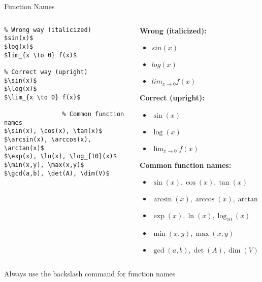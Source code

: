 \begin{frame}[fragile]{Function Names}
    \begin{columns}
        \begin{column}{0.5\textwidth}
            \begin{lstlisting}
% Wrong way (italicized)
$sin(x)$
$log(x)$
$lim_{x \to 0} f(x)$

% Correct way (upright)
$\sin(x)$
$\log(x)$
$\lim_{x \to 0} f(x)$
                
                % Common function names
$\sin(x), \cos(x), \tan(x)$
$\arcsin(x), \arccos(x), \arctan(x)$
$\exp(x), \ln(x), \log_{10}(x)$
$\min(x,y), \max(x,y)$
$\gcd(a,b), \det(A), \dim(V)$
            \end{lstlisting}
        \end{column}
        
        \begin{column}{0.5\textwidth}
            \textbf{Wrong (italicized):}
            \begin{itemize}
                \item $sin(x)$
                \item $log(x)$
                \item $lim_{x \to 0} f(x)$
            \end{itemize}
            
            \textbf{Correct (upright):}
            \begin{itemize}
                \item $\sin(x)$
                \item $\log(x)$
                \item $\lim_{x \to 0} f(x)$
            \end{itemize}
            
            \textbf{Common function names:}
            \begin{itemize}
                \item $\sin(x), \cos(x), \tan(x)$
                \item $\arcsin(x), \arccos(x), \arctan(x)$
                \item $\exp(x), \ln(x), \log_{10}(x)$
                \item $\min(x,y), \max(x,y)$
                \item $\gcd(a,b), \det(A), \dim(V)$
            \end{itemize}
        \end{column}
    \end{columns}
    
    \begin{tip}
        Always use the backslash command for function names
    \end{tip}
\end{frame}

